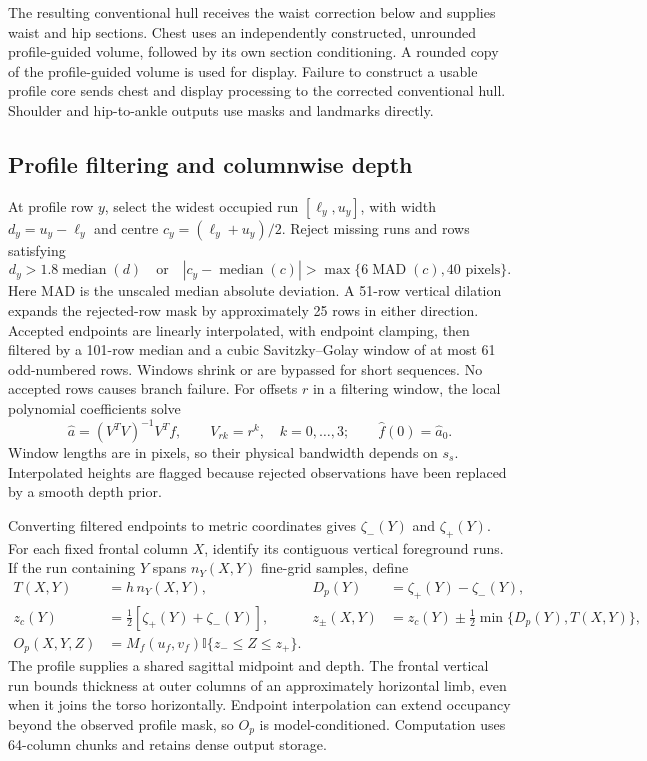 \documentclass[11pt,a4paper]{article}
\newcommand{\indic}{\mathbb I}
\begin{document}
The resulting conventional hull receives the waist correction below and supplies waist and hip sections. Chest uses an independently constructed, unrounded profile-guided volume, followed by its own section conditioning. A rounded copy of the profile-guided volume is used for display. Failure to construct a usable profile core sends chest and display processing to the corrected conventional hull. Shoulder and hip-to-ankle outputs use masks and landmarks directly.

\subsection{Profile filtering and columnwise depth}
At profile row $y$, select the widest occupied run $[\ell_y,u_y]$, with width $d_y=u_y-\ell_y$ and centre $c_y=(\ell_y+u_y)/2$. Reject missing runs and rows satisfying
\begin{equation}
 d_y>1.8\operatorname{median}(d)\quad\text{or}\quad
 |c_y-\operatorname{median}(c)|>
 \max\{6\operatorname{MAD}(c),40\text{ pixels}\}.
\end{equation}
Here MAD is the unscaled median absolute deviation. A 51-row vertical dilation expands the rejected-row mask by approximately 25 rows in either direction. Accepted endpoints are linearly interpolated, with endpoint clamping, then filtered by a 101-row median and a cubic Savitzky--Golay window of at most 61 odd-numbered rows. Windows shrink or are bypassed for short sequences. No accepted rows causes branch failure. For offsets $r$ in a filtering window, the local polynomial coefficients solve
\begin{equation}
 \hat a=(V^TV)^{-1}V^Tf,\qquad V_{rk}=r^k,\quad k=0,\ldots,3;
 \qquad \hat f(0)=\hat a_0.
\end{equation}
Window lengths are in pixels, so their physical bandwidth depends on $s_s$. Interpolated heights are flagged because rejected observations have been replaced by a smooth depth prior.

Converting filtered endpoints to metric coordinates gives $\zeta_-(Y)$ and $\zeta_+(Y)$. For each fixed frontal column $X$, identify its contiguous vertical foreground runs. If the run containing $Y$ spans $n_Y(X,Y)$ fine-grid samples, define
\begin{equation}
 \begin{aligned}
 T(X,Y)&=h\,n_Y(X,Y),&
 D_p(Y)&=\zeta_+(Y)-\zeta_-(Y),\\
 z_c(Y)&=\tfrac12[\zeta_+(Y)+\zeta_-(Y)],&
 z_\pm(X,Y)&=z_c(Y)\pm\tfrac12\min\{D_p(Y),T(X,Y)\},\\
 O_p(X,Y,Z)&=M_f(u_f,v_f)\indic\{z_-\leq Z\leq z_+\}.&&
 \end{aligned}
 \label{eq:profile}
\end{equation}
The profile supplies a shared sagittal midpoint and depth. The frontal vertical run bounds thickness at outer columns of an approximately horizontal limb, even when it joins the torso horizontally. Endpoint interpolation can extend occupancy beyond the observed profile mask, so $O_p$ is model-conditioned. Computation uses 64-column chunks and retains dense output storage.
\end{document}
